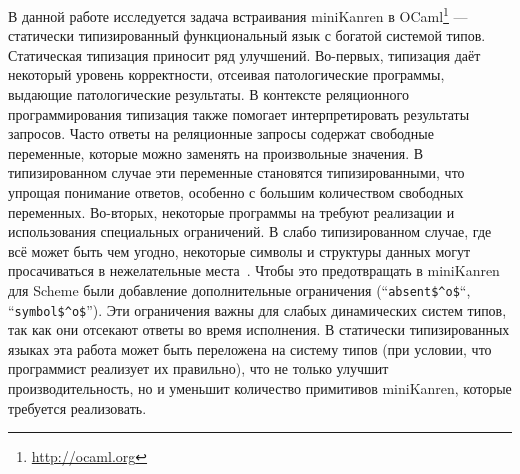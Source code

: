 В данной работе исследуется задача встраивания miniKanren в OCaml\footnote{\url{http://ocaml.org}} --- статически типизированный функциональный язык с богатой системой типов.
Статическая типизация приносит ряд улучшений.
Во-первых, типизация даёт некоторый уровень корректности, отсеивая патологические программы, выдающие патологические результаты.
В контексте реляционного программирования типизация также помогает интерпретировать результаты запросов.
Часто ответы на реляционные запросы содержат свободные переменные, которые можно заменять на произвольные значения.
В типизированном случае эти переменные становятся типизированными, что упрощая понимание ответов, особенно с большим количеством свободных переменных.
Во-вторых, некоторые программы на \miniKanren{} требуют реализации и использования специальных ограничений.
В слабо типизированном случае, где всё может быть чем угодно, некоторые символы и структуры данных могут просачиваться в нежелательные места~\cite{Untagged}.
Чтобы это предотвращать в miniKanren для Scheme были добавление дополнительные ограничения (``\lstinline|absent$^o$|``, ``\lstinline|symbol$^o$|'').
Эти ограничения важны для слабых динамических систем типов, так как они отсекают ответы во время исполнения.
В статически типизированных языках эта работа может быть переложена на систему типов (при условии, что программист реализует их правильно), что не только улучшит производительность, но и уменьшит количество примитивов miniKanren, которые требуется реализовать.


